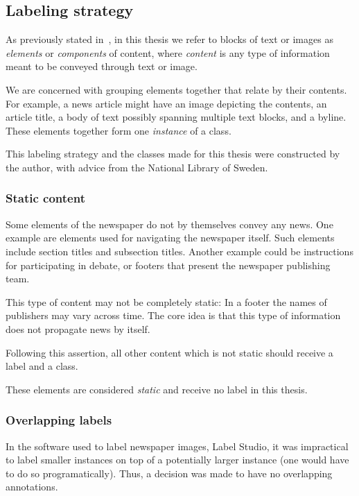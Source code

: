 \documentclass[oneside, english, bibtex]{kththesis}
\begin{document}
\subsection{Labeling strategy}
\label{subsec:labelingstrat}

As previously stated in\ , in this thesis we refer to blocks of text or images as \textit{elements} or \textit{components} of content, where \textit{content} is any type of information meant to be conveyed through text or image.

We are concerned with grouping elements together that relate by their contents.
For example, a news article might have an image depicting the contents, an article title, a body of text possibly spanning multiple text blocks, and a byline.
These elements together form one \textit{instance} of a class.

This labeling strategy and the classes made for this thesis were constructed by the author, with advice from the National Library of Sweden.

\subsubsection{Static content}
\label{subsec:static}

Some elements of the newspaper do not by themselves convey any news. One example are elements used for navigating the newspaper itself.
Such elements include section titles and subsection titles. Another example could be instructions for participating in debate, or footers that present the newspaper publishing team.

This type of content may not be completely static: In a footer the names of publishers may vary across time. The core idea is that this type of information does not propagate news by itself.

Following this assertion, all other content which is not static should receive a label and a class.

These elements are considered \textit{static} and receive no label in this thesis.

\subsubsection{Overlapping labels}
\label{subsub:overlappinglabels}

In the software used to label newspaper images, Label Studio, it was impractical to label smaller instances on top of a potentially larger instance (one would have to do so programatically). Thus, a decision was made to have no overlapping annotations.
\end{document}

